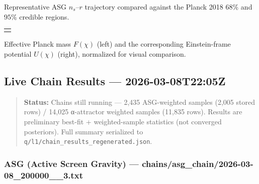 \documentclass[
]{article}
\newcounter{none} %
\begin{document}
Representative ASG \(n_{s}\)--\(r\) trajectory compared against the
Planck 2018 \(68\%\) and \(95\%\) credible regions.

{\def\LTcaptype{none} %
\begin{longtable}[]{@{}c@{}}
\toprule\noalign{}
\endhead
\bottomrule\noalign{}
\endlastfoot
 \\
\end{longtable}
}

Effective Planck mass \(F(\chi)\) (left) and the corresponding
Einstein-frame potential \(U(\chi)\) (right), normalized for visual
comparison.

\subsection{Live Chain Results ---
2026-03-08T22:05Z}\label{live-chain-results-2026-03-08t2205z}

\begin{quote}
\textbf{Status:} Chains still running --- 2,435 ASG-weighted samples
(2,005 stored rows) / 14,025 α-attractor weighted samples (11,835 rows).
Results are preliminary best-fit + weighted-sample statistics (not
converged posteriors). Full summary serialized to
\texttt{q/l1/chain\_results\_regenerated.json}.
\end{quote}

\subsubsection{ASG (Active Screen Gravity) ---
chains/asg\_chain/2026-03-08\_200000\_\_3.txt}\label{asg-active-screen-gravity-chainsasg_chain2026-03-08_200000__3.txt}
\end{document}
